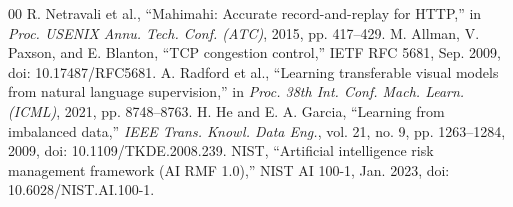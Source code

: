 \documentclass[conference,a4paper]{IEEEtran}
\begin{document}
\begin{thebibliography}{00}
R. Netravali et al., ``Mahimahi: Accurate record-and-replay for HTTP,'' in \emph{Proc. USENIX Annu. Tech. Conf. (ATC)}, 2015, pp. 417--429.
M. Allman, V. Paxson, and E. Blanton, ``TCP congestion control,'' IETF RFC 5681, Sep. 2009, doi: 10.17487/RFC5681.
A. Radford et al., ``Learning transferable visual models from natural language supervision,'' in \emph{Proc. 38th Int. Conf. Mach. Learn. (ICML)}, 2021, pp. 8748--8763.
H. He and E. A. Garcia, ``Learning from imbalanced data,'' \emph{IEEE Trans. Knowl. Data Eng.}, vol. 21, no. 9, pp. 1263--1284, 2009, doi: 10.1109/TKDE.2008.239.
NIST, ``Artificial intelligence risk management framework (AI RMF 1.0),'' NIST AI 100-1, Jan. 2023, doi: 10.6028/NIST.AI.100-1.
\end{thebibliography}
\end{document}
